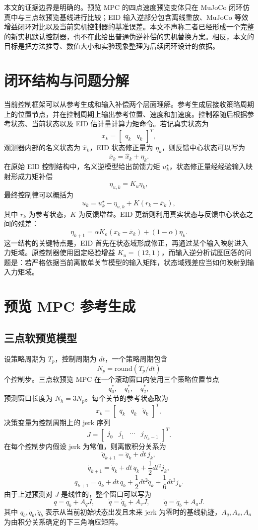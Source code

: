 \documentclass[12pt,a4paper]{ctexart}
\begin{document}
本文的证据边界是明确的。预览 MPC 的四点速度预览变体只在 MuJoCo 闭环仿真中与三点软预览基线进行比较；EID 输入逆部分包含离线重放、MuJoCo 等效增益闭环对比以及当前实机控制器的基准误差。本文不声称二者已经形成一个完整的新实机默认控制器，也不在此给出普通伪逆补偿的实机替换方案。相反，本文的目标是把方法推导、数值大小和实验现象整理为后续闭环设计的依据。

\section{闭环结构与问题分解}

当前控制框架可以从参考生成和输入补偿两个层面理解。参考生成层接收策略周期上的位置节点，并在控制周期上输出参考位置、速度和加速度。控制器随后根据参考状态、当前状态以及 EID 估计量计算力矩命令。若记真实状态为
\[
    x_k=\begin{bmatrix}q_k & \dot q_k\end{bmatrix}^T,
\]
观测器内部的名义状态为 \(\hat x_k\)，EID 状态修正量为 \(\eta_k\)，则反馈中心状态可以写为
\[
    \bar x_k=\hat x_k+\eta_k.
\]
在原始 EID 控制结构中，名义逆模型给出前馈力矩 \(u_k^\star\)，状态修正量经经验输入映射形成力矩补偿
\[
    \eta_{u,k}=K_u\eta_k,
\]
最终控制律可以概括为
\[
    u_k=u_k^\star-\eta_{u,k}+K(r_k-\bar x_k),
\]
其中 \(r_k\) 为参考状态，\(K\) 为反馈增益。EID 更新则利用真实状态与反馈中心状态之间的残差：
\[
    \eta_{k+1}=\alpha K_o(x_k-\bar x_k)+(1-\alpha)\eta_k .
\]
这一结构的关键特点是，EID 首先在状态域形成修正，再通过某个输入映射进入力矩域。原控制器使用固定经验增益 \(K_u=(12,1)\)，而输入逆分析试图回答的问题是：若严格依据当前离散单关节模型的输入矩阵，状态域残差应当如何映射到输入力矩域。

\section{预览 MPC 参考生成}

\subsection{三点软预览模型}

设策略周期为 \(T_p\)，控制周期为 \(dt\)，一个策略周期包含
\[
    N_p=\mathrm{round}(T_p/dt)
\]
个控制步。三点软预览 MPC 在一个滚动窗口内使用三个策略位置节点
\[
    q_0^\ast,\quad q_1^\ast,\quad q_2^\ast,
\]
预测窗口长度为 \(N_h=3N_p\)。每个关节的参考状态取为
\[
    x_k=\begin{bmatrix}q_k & \dot q_k & \ddot q_k\end{bmatrix}^T,
\]
决策变量为控制周期上的 jerk 序列
\[
    J=\begin{bmatrix}j_0 & j_1 & \cdots & j_{N_h-1}\end{bmatrix}^T .
\]
在每个控制步内假设 jerk 为常值，则离散积分关系为
\[
    \ddot q_{k+1}=\ddot q_k+dt\,j_k,
\]
\[
    \dot q_{k+1}=\dot q_k+dt\,\ddot q_k+\frac{1}{2}dt^2j_k,
\]
\[
    q_{k+1}=q_k+dt\,\dot q_k+\frac{1}{2}dt^2\ddot q_k+\frac{1}{6}dt^3j_k.
\]
由于上述预测对 \(J\) 是线性的，整个窗口可以写为
\[
    q=q_b+A_qJ,\qquad
    \dot q=\dot q_b+A_vJ,\qquad
    \ddot q=\ddot q_b+A_aJ.
\]
其中 \(q_b,\dot q_b,\ddot q_b\) 表示从当前初始状态出发且未来 jerk 为零时的基线轨迹，\(A_q,A_v,A_a\) 为由积分关系确定的下三角响应矩阵。
\end{document}
